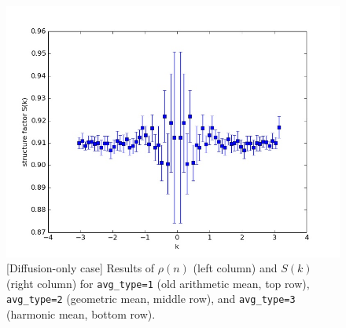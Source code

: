 \documentclass{article}
\begin{document}
\begin{figure}[ht!]
\includegraphics[width=0.5\linewidth]{fig1/diff_Sk_avg3.jpg}
\caption{\label{fig_diff_123}[Diffusion-only case] Results of $\rho(n)$ (left column) and $S(k)$ (right column) for \texttt{avg\_type=1} (old arithmetic mean, top row), \texttt{avg\_type=2} (geometric mean, middle row), and \texttt{avg\_type=3} (harmonic mean, bottom row).
}
\end{figure}
\end{document}
